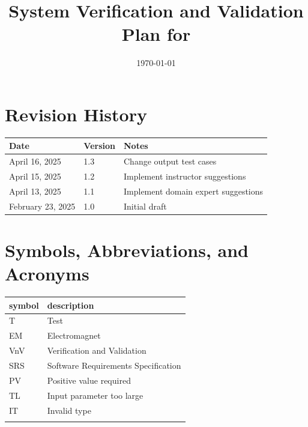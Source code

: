 \documentclass[12pt, titlepage]{article}
\begin{document}
\title{System Verification and Validation Plan for \progname{}} 
\author{\authname}
\date{\today}
	
\maketitle


\section*{Revision History}

\begin{tabularx}{\textwidth}{p{3.5cm}p{2cm}X}
\toprule {\bf Date} & {\bf Version} & {\bf Notes}\\
\midrule
April 16, 2025 & 1.3 & Change output test cases\\
\midrule
April 15, 2025 & 1.2 & Implement  instructor suggestions\\
\midrule
April 13, 2025 & 1.1 & Implement domain expert suggestions\\
\midrule
February 23, 2025 & 1.0 & Initial draft\\
\bottomrule
\end{tabularx}


\newpage

\tableofcontents
\newpage

\section{Symbols, Abbreviations, and Acronyms}

\renewcommand{\arraystretch}{1.2}
\begin{tabular}{l l} 
  \toprule		
  \textbf{symbol} & \textbf{description}\\
  \midrule 
  T & Test\\
  EM & Electromagnet\\
  VnV & Verification and Validation \\
  SRS & Software Requirements Specification \\
  PV & Positive value required \\
  TL & Input parameter too large \\
  IT & Invalid type \\
  \bottomrule
  \label{abbrevs}
\end{tabular}\\

\newpage
\end{document}
